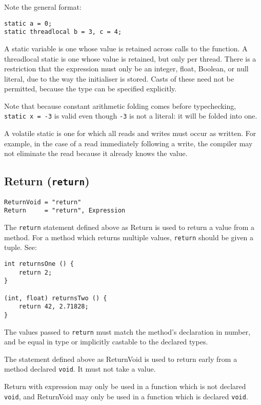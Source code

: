 \documentclass{article}
\begin{document}
Note the general format:
\begin{verbatim}
static a = 0;
static threadlocal b = 3, c = 4;
\end{verbatim}

A static variable is one whose value is retained across calls to the function.
A threadlocal static is one whose value is retained, but only per thread.
There is a restriction that the expression must only be an integer, float,
Boolean, or null literal, due to the way the initialiser is stored. Casts of
these need not be permitted, because the type can be specified explicitly.

Note that because constant arithmetic folding comes before typechecking,
\texttt{static~x~=~-3} is valid even though \texttt{-3} is not a literal: it
will be folded into one.

A volatile static is one for which all reads and writes must occur as written.
For example, in the case of a read immediately following a write, the compiler
may not eliminate the read because it already knows the value.

\subsection{Return (\texttt{return})}
\label{sub:statements:return}
\begin{verbatim}
ReturnVoid = "return"
Return     = "return", Expression
\end{verbatim}

The \texttt{return} statement defined above as Return is used to return a
value from a method. For a method which returns multiple values,
\texttt{return} should be given a tuple. See:
\begin{verbatim}
int returnsOne () {
    return 2;
}

(int, float) returnsTwo () {
    return 42, 2.71828;
}
\end{verbatim}

The values passed to \texttt{return} must match the method's declaration in
number, and be equal in type or implicitly castable to the declared types.

The statement defined above as ReturnVoid is used to return early from a
method declared \texttt{void}. It must not take a value.

Return with expression may only be used in a function which is not declared
\texttt{void}, and ReturnVoid may only be used in a function which is declared
\texttt{void}.
\end{document}
